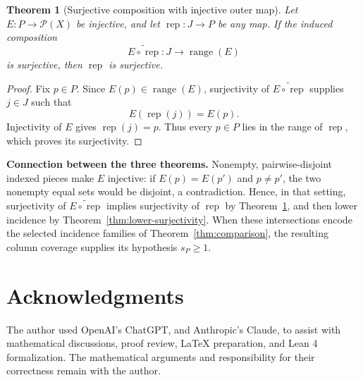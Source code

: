 \documentclass[11pt, letterpaper]{nyjm}
\newtheorem{theorem}{Theorem}[section]
\newcommand{\range}{\operatorname{range}}
\newcommand{\rep}{\operatorname{rep}}
\begin{document}
	\begin{theorem}[Surjective composition with injective outer
		map]\label{thm:composite}
		Let $E:P\to\mathcal P(X)$ be injective, and let
		$\rep:J\to P$ be any map. If the induced composition
		\[
		\widetilde{E\circ\rep}:J\longrightarrow\range(E)
		\]
		is surjective, then $\rep$ is surjective.
	\end{theorem}
	
	\begin{proof}
		Fix $p\in P$. Since $E(p)\in\range(E)$, surjectivity of
		$\widetilde{E\circ\rep}$ supplies $j\in J$ such that
		\[
		E(\rep(j))=E(p).
		\]
		Injectivity of $E$ gives $\rep(j)=p$. Thus every $p\in P$ lies in
		the range of $\rep$, which proves its surjectivity.
	\end{proof}
	
	\noindent
	\textbf{Connection between the three theorems.}
	Nonempty, pairwise-disjoint indexed pieces make $E$ injective: if
	$E(p)=E(p')$ and $p\ne p'$, the two nonempty equal sets would be
	disjoint, a contradiction. Hence, in that setting, surjectivity of
	$\widetilde{E\circ\rep}$ implies surjectivity of $\rep$ by
	Theorem~\ref{thm:composite}, and then lower incidence by
	Theorem~\ref{thm:lower-surjectivity}. When these intersections encode the
	selected incidence families of Theorem~\ref{thm:comparison}, the
	resulting column coverage supplies its hypothesis $s_P\geq1$.
	
	
	
	\section*{Acknowledgments}
	
	The author used OpenAI's ChatGPT, and Anthropic's Claude, to assist with
	mathematical discussions, proof review, LaTeX
	preparation, and Lean 4 formalization.
	The mathematical arguments and responsibility
	for their correctness remain with the author.
	
\end{document}
